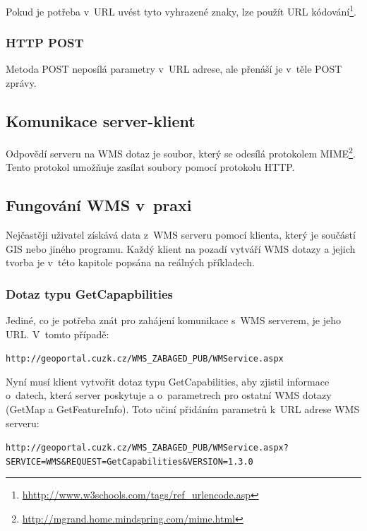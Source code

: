 \documentclass[a4paper,12pt]{article}
\begin{document}
Pokud je potřeba v~URL uvést tyto vyhrazené znaky, lze použít URL
kódování\footnote{\url{hhttp://www.w3schools.com/tags/ref_urlencode.asp}}.

\subsubsection{HTTP POST}

Metoda POST neposílá parametry v~URL adrese, ale přenáší je v~těle
POST zprávy.


\subsection{Komunikace server-klient}

Odpovědí serveru na WMS dotaz je soubor, který se odesílá protokolem
MIME\footnote{\url{http://mgrand.home.mindspring.com/mime.html}}. Tento
protokol umožňuje zasílat soubory pomocí protokolu HTTP.


\subsection{Fungování WMS v~praxi}

 
Nejčastěji uživatel získává data z~WMS serveru pomocí klienta, který
je součástí GIS nebo jiného programu. Každý klient na pozadí vytváří
WMS dotazy a jejich tvorba je v~této kapitole popsána na reálných
příkladech.

\newpage
\subsubsection{Dotaz typu GetCapapbilities}

Jediné, co je potřeba znát pro zahájení komunikace s~WMS serverem, je
jeho URL. V~tomto případě:
\begin{alltt}\footnotesize
http://geoportal.cuzk.cz/WMS_ZABAGED_PUB/WMService.aspx
\end{alltt}

Nyní musí klient vytvořit dotaz typu GetCapabilities, aby zjistil
informace o~datech, která server poskytuje a o~parametrech pro ostatní
WMS dotazy (GetMap a GetFeatureInfo).  Toto učiní přidáním parametrů
k~URL adrese WMS serveru:

\begin{alltt}\footnotesize
http://geoportal.cuzk.cz/WMS_ZABAGED_PUB/WMService.aspx?
SERVICE=WMS&REQUEST=GetCapabilities&VERSION=1.3.0
\end{alltt}
\end{document}
